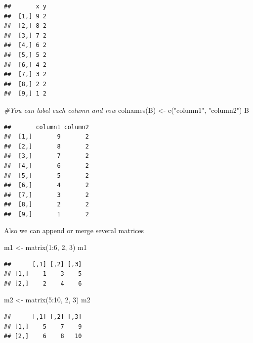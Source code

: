 \documentclass[
]{book}
\newenvironment{Shaded}{\begin{snugshade}}{\end{snugshade}}
\newcommand{\CommentTok}[1]{\textcolor[rgb]{0.56,0.35,0.01}{\textit{#1}}}
\newcommand{\DecValTok}[1]{\textcolor[rgb]{0.00,0.00,0.81}{#1}}
\newcommand{\FunctionTok}[1]{\textcolor[rgb]{0.00,0.00,0.00}{#1}}
\newcommand{\NormalTok}[1]{#1}
\newcommand{\OtherTok}[1]{\textcolor[rgb]{0.56,0.35,0.01}{#1}}
\newcommand{\SpecialCharTok}[1]{\textcolor[rgb]{0.00,0.00,0.00}{#1}}
\newcommand{\StringTok}[1]{\textcolor[rgb]{0.31,0.60,0.02}{#1}}
\theoremstyle{definition}
\theoremstyle{definition}
\theoremstyle{definition}
\theoremstyle{definition}
\theoremstyle{remark}
\begin{document}
\begin{verbatim}
##       x y
##  [1,] 9 2
##  [2,] 8 2
##  [3,] 7 2
##  [4,] 6 2
##  [5,] 5 2
##  [6,] 4 2
##  [7,] 3 2
##  [8,] 2 2
##  [9,] 1 2
\end{verbatim}

\begin{Shaded}
\begin{Highlighting}[]
\CommentTok{\#You can label each column and row}
\FunctionTok{colnames}\NormalTok{(B) }\OtherTok{\textless{}{-}} \FunctionTok{c}\NormalTok{(}\StringTok{"column1"}\NormalTok{, }\StringTok{"column2"}\NormalTok{)}
\NormalTok{B}
\end{Highlighting}
\end{Shaded}

\begin{verbatim}
##       column1 column2
##  [1,]       9       2
##  [2,]       8       2
##  [3,]       7       2
##  [4,]       6       2
##  [5,]       5       2
##  [6,]       4       2
##  [7,]       3       2
##  [8,]       2       2
##  [9,]       1       2
\end{verbatim}

Also we can append or merge several matrices

\begin{Shaded}
\begin{Highlighting}[]
\NormalTok{m1 }\OtherTok{\textless{}{-}} \FunctionTok{matrix}\NormalTok{(}\DecValTok{1}\SpecialCharTok{:}\DecValTok{6}\NormalTok{, }\DecValTok{2}\NormalTok{, }\DecValTok{3}\NormalTok{)}
\NormalTok{m1}
\end{Highlighting}
\end{Shaded}

\begin{verbatim}
##      [,1] [,2] [,3]
## [1,]    1    3    5
## [2,]    2    4    6
\end{verbatim}

\begin{Shaded}
\begin{Highlighting}[]
\NormalTok{m2 }\OtherTok{\textless{}{-}} \FunctionTok{matrix}\NormalTok{(}\DecValTok{5}\SpecialCharTok{:}\DecValTok{10}\NormalTok{, }\DecValTok{2}\NormalTok{, }\DecValTok{3}\NormalTok{)}
\NormalTok{m2}
\end{Highlighting}
\end{Shaded}

\begin{verbatim}
##      [,1] [,2] [,3]
## [1,]    5    7    9
## [2,]    6    8   10
\end{verbatim}
\end{document}
